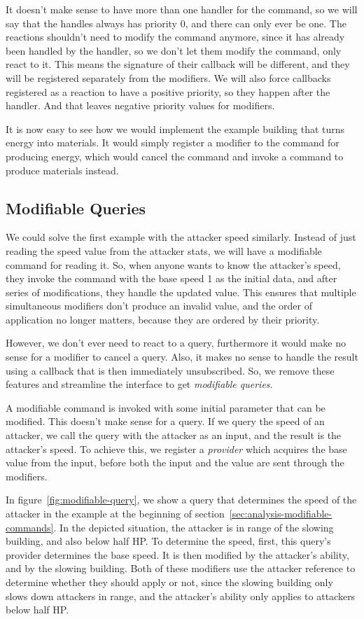 It doesn't make sense to have more than one handler for the command, so we will say that the handles always has priority 0, and there can only ever be one.
The reactions shouldn't need to modify the command anymore, since it has already been handled by the handler, so we don't let them modify the command, only react to it.
This means the signature of their callback will be different, and they will be registered separately from the modifiers.
We will also force callbacks registered as a reaction to have a positive priority, so they happen after the handler.
And that leaves negative priority values for modifiers.

It is now easy to see how we would implement the example building that turns energy into materials.
It would simply register a modifier to the command for producing energy, which would cancel the command and invoke a command to produce materials instead.

\subsection{Modifiable Queries}

We could solve the first example with the attacker speed similarly.
Instead of just reading the speed value from the attacker stats, we will have a modifiable command for reading it.
So, when anyone wants to know the attacker's speed, they invoke the command with the base speed 1 as the initial data, and after series of modifications, they handle the updated value.
This ensures that multiple simultaneous modifiers don't produce an invalid value, and the order of application no longer matters, because they are ordered by their priority.

However, we don't ever need to react to a query, furthermore it would make no sense for a modifier to cancel a query.
Also, it makes no sense to handle the result using a callback that is then immediately unsubscribed.
So, we remove these features and streamline the interface to get \emph{modifiable queries}.

A modifiable command is invoked with some initial parameter that can be modified.
This doesn't make sense for a query.
If we query the speed of an attacker, we call the query with the attacker as an input, and the result is the attacker's speed.
To achieve this, we register a \emph{provider} which acquires the base value from the input, before both the input and the value are sent through the modifiers.

In figure~\ref{fig:modifiable-query}, we show a query that determines the speed of the attacker in the example at the beginning of section~\ref{sec:analysis-modifiable-commands}.
In the depicted situation, the attacker is in range of the slowing building, and also below half HP.
To determine the speed, first, this query's provider determines the base speed.
It is then modified by the attacker's ability, and by the slowing building.
Both of these modifiers use the attacker reference to determine whether they should apply or not, since the slowing building only slows down attackers in range, and the attacker's ability only applies to attackers below half HP.


